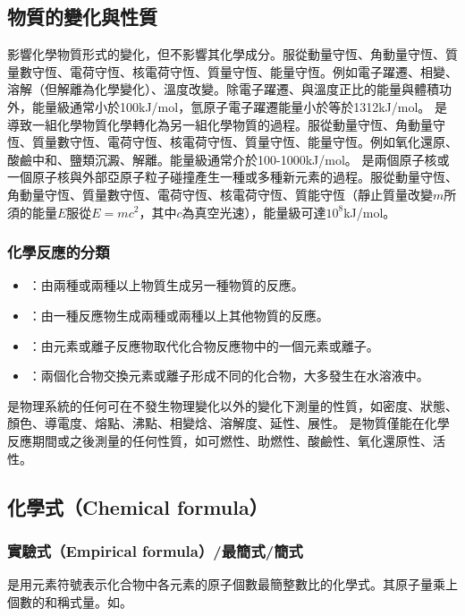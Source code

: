 \documentclass[a4paper,12pt]{article}
\begin{document}
\subsection{物質的變化與性質}
影響化學物質形式的變化，但不影響其化學成分。服從動量守恆、角動量守恆、質量數守恆、電荷守恆、核電荷守恆、質量守恆、能量守恆。例如電子躍遷、相變、溶解（但解離為化學變化）、溫度改變。除電子躍遷、與溫度正比的能量與體積功外，能量級通常小於100kJ/mol，氫原子電子躍遷能量小於等於1312kJ/mol。
是導致一組化學物質化學轉化為另一組化學物質的過程。服從動量守恆、角動量守恆、質量數守恆、電荷守恆、核電荷守恆、質量守恆、能量守恆。例如氧化還原、酸鹼中和、鹽類沉澱、解離。能量級通常介於100-1000kJ/mol。
是兩個原子核或一個原子核與外部亞原子粒子碰撞產生一種或多種新元素的過程。服從動量守恆、角動量守恆、質量數守恆、電荷守恆、核電荷守恆、質能守恆（靜止質量改變$m$所須的能量$E$服從$E=mc^2$，其中$c$為真空光速），能量級可達$10^8$kJ/mol。
\subsubsection{化學反應的分類}
\begin{itemize}
\item{}：由兩種或兩種以上物質生成另一種物質的反應。
\item{}：由一種反應物生成兩種或兩種以上其他物質的反應。
\item{}：由元素或離子反應物取代化合物反應物中的一個元素或離子。
\item{}：兩個化合物交換元素或離子形成不同的化合物，大多發生在水溶液中。
\end{itemize}
是物理系統的任何可在不發生物理變化以外的變化下測量的性質，如密度、狀態、顏色、導電度、熔點、沸點、相變焓、溶解度、延性、展性。
是物質僅能在化學反應期間或之後測量的任何性質，如可燃性、助燃性、酸鹼性、氧化還原性、活性。
\subsection{化學式（Chemical formula）}
\subsubsection{實驗式（Empirical formula）/最簡式/簡式}
是用元素符號表示化合物中各元素的原子個數最簡整數比的化學式。其原子量乘上個數的和稱式量。如。
\end{document}

